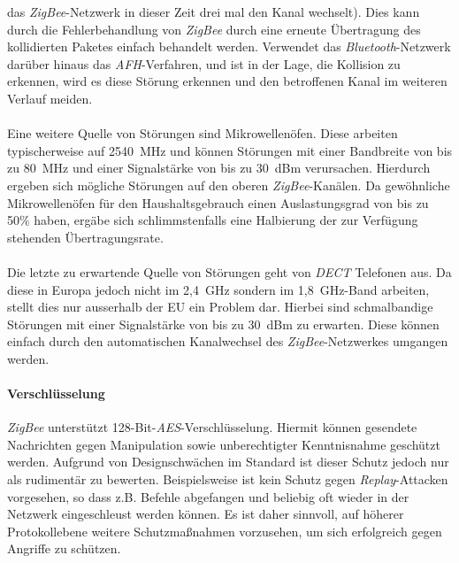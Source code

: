                 das \emph{ZigBee}-Netzwerk in dieser Zeit drei mal den Kanal wechselt). Dies kann durch die Fehlerbehandlung
                von \emph{ZigBee} durch eine erneute Übertragung des kollidierten Paketes einfach behandelt werden. Verwendet
                das \emph{Bluetooth}-Netzwerk darüber hinaus das \emph{AFH}-Verfahren, und ist in der Lage, die Kollision zu
                erkennen, wird es diese Störung erkennen und den betroffenen Kanal im weiteren Verlauf meiden.\\
                \\
                Eine weitere Quelle von Störungen sind Mikrowellenöfen. Diese arbeiten typischerweise
                auf 2540~MHz und können Störungen mit einer Bandbreite von bis zu 80~MHz und einer Signalstärke
                von bis zu 30~dBm verursachen. Hierdurch ergeben sich mögliche Störungen auf den
                oberen \emph{ZigBee}-Kanälen. Da gewöhnliche Mikrowellenöfen für den Haushaltsgebrauch einen 
                Auslastungsgrad von bis zu 50\% haben, ergäbe sich schlimmstenfalls eine Halbierung der
                zur Verfügung stehenden Übertragungsrate.\\
                \\
                Die letzte zu erwartende Quelle von Störungen geht von \emph{DECT} Telefonen aus. Da diese in Europa
                jedoch nicht im 2,4~GHz sondern im 1,8~GHz-Band arbeiten, stellt dies nur ausserhalb der EU ein
                Problem dar. Hierbei sind schmalbandige Störungen mit einer Signalstärke von bis zu 30~dBm 
                zu erwarten. Diese können einfach durch den automatischen Kanalwechsel des \emph{ZigBee}-Netzwerkes
                umgangen werden.\\

            \paragraph{Verschlüsselung}
                \emph{ZigBee} unterstützt 128-Bit-\emph{AES}-Verschlüsselung. Hiermit können gesendete Nachrichten 
                gegen Manipulation sowie unberechtigter Kenntnisnahme geschützt werden. Aufgrund von Designschwächen 
                im Standard ist dieser Schutz jedoch nur als rudimentär zu bewerten. Beispielsweise ist
                kein Schutz gegen \emph{Replay}-Attacken vorgesehen, so dass z.B. Befehle abgefangen und beliebig oft
                wieder in der Netzwerk eingeschleust werden können. Es ist daher sinnvoll, auf höherer 
                Protokollebene weitere Schutzmaßnahmen vorzusehen, um sich erfolgreich gegen Angriffe zu
                schützen.

